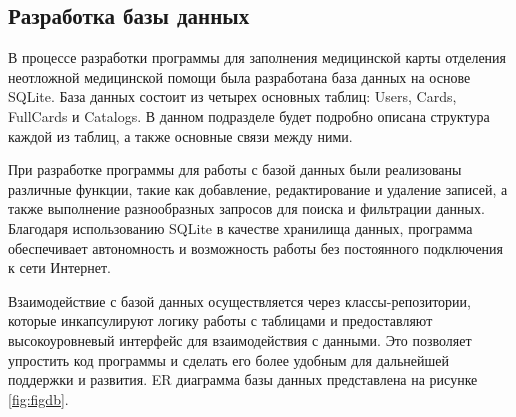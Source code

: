 \subsection{Разработка базы данных}
В процессе разработки программы для заполнения медицинской карты отделения неотложной медицинской помощи была разработана база данных на основе SQLite. База данных состоит из четырех основных таблиц: Users, Cards, FullCards и Catalogs. В данном подразделе будет подробно описана структура каждой из таблиц, а также основные связи между ними.

При разработке программы для работы с базой данных были реализованы различные функции, такие как добавление, редактирование и удаление записей, а также выполнение разнообразных запросов для поиска и фильтрации данных. Благодаря использованию SQLite в качестве хранилища данных, программа обеспечивает автономность и возможность работы без постоянного подключения к сети Интернет.

Взаимодействие с базой данных осуществляется через классы-репозитории, которые инкапсулируют логику работы с таблицами и предоставляют высокоуровневый интерфейс для взаимодействия с данными. Это позволяет упростить код программы и сделать его более удобным для дальнейшей поддержки и развития. ER диаграмма базы данных представлена на рисунке \ref{fig:figdb}.

